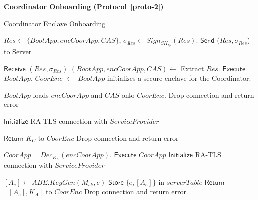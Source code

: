 \noindent
{\bf Coordinator Onboarding (Protocol~\ref{proto-2})}





\begin{algorithm}[t]
\small
\caption{Coordinator Enclave Onboarding}
\label{proto-2}
\begin{algorithmic}[1]
\item[]



\begin{center}
\end{center}
\STATE $Res \leftarrow   \{BootApp, encCoorApp,  CAS\}$, $\sigma_{Res}\leftarrow Sign_{SK_{sp}}(Res)$.
\STATE $\mathsf{Send}$ ($Res,\sigma_{Res}$) to Server
\begin{center}
\end{center}
\STATE $\mathsf{Receive}$  $(Res, \sigma_{Res})$
\STATE $(BootApp, encCoorApp, CAS) \gets$ Extract $Res$.
\STATE $\mathsf{Execute}$ $BootApp$, 
\STATE $CoorEnc$ $\gets$ $BootApp$ initializes a secure enclave for the Coordinator.

\STATE $BootApp$ loads $encCoorApp$ and $CAS$ onto $CoorEnc$.
\ELSE
    \STATE Drop connection and return error 
\ENDIF
\begin{center}
\end{center}
\STATE $\mathsf{Initialize}$ RA-TLS connection with $ServiceProvider$
\begin{center}
\end{center}
\STATE $\mathsf{Return}$ $K_{C}$ to $CoorEnc$
\ELSE
    \STATE Drop connection and return error 
\ENDIF

\begin{center}
\end{center}

\STATE $CoorApp = {Dec}_{K_C}(encCoorApp)$.
\STATE $\mathsf{Execute}$ $CoorApp$
\STATE $\mathsf{Initialize}$ RA-TLS connection with $ServiceProvider$

\begin{center}
\end{center}
\STATE $[A_e] \gets ABE.KeyGen(M_{sk}, e)$
\STATE  $\mathsf{Store}$ $\{e, [A_e ]\}$ in $serverTable$
\STATE $\mathsf{Return}$ $[[A_e], K_A] $ to $CoorEnc$
\ELSE
    \STATE Drop connection and return error 
\ENDIF

\end{algorithmic}
\end{algorithm}

